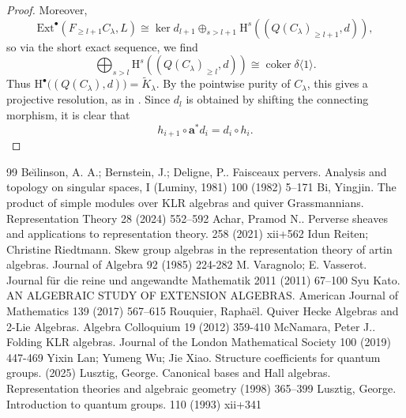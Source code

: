 \documentclass[10pt,a4paper]{amsart}
\begin{document}
\begin{proof}
Moreover,
\[
\mathrm{Ext}^{\bullet}(F_{\geq l+1} C_{\lambda}, L) \cong \ker d_{l+1} \oplus_{s>l+1} \mathrm{H}^s((Q(C_{\lambda})_{\geq l+1}, d)),
\]
so via the short exact sequence, we find
\[
\bigoplus_{s>l} \mathrm{H}^s((Q(C_{\lambda})_{\geq l}, d)) \cong \operatorname{coker} \delta \langle 1 \rangle.
\]
Thus $\mathrm{H}^{\bullet}\bigl((Q(C_{\lambda}), d)\bigr) = \widetilde{K}_{\lambda}$. By the pointwise purity of $C_{\lambda}$, this gives a projective resolution, as in \cite[Proposition 2.8]{cd088214-009e-3813-9a86-97f9a299a24c}.
Since $d_l$ is obtained by shifting the connecting morphism, it is clear that
\[
h_{i+1} \circ \mathbf{a}^* d_i = d_i \circ h_i.
\]
\end{proof}


\begin{thebibliography}{99}
 Be\u{\i}linson, A. A.; Bernstein, J.; Deligne, P.. Faisceaux pervers. Analysis and topology on singular spaces, {I} ({L}uminy, 1981) 100 (1982) 5--171
 Bi, Yingjin. The product of simple modules over {KLR} algebras and quiver {G}rassmannians. Representation Theory 28 (2024) 552--592
 Achar, Pramod N.. Perverse sheaves and applications to representation theory. 258 (2021) xii+562
 Idun Reiten; Christine Riedtmann. Skew group algebras in the representation theory of artin algebras. Journal of Algebra 92 (1985) 224-282
 M. Varagnolo; E. Vasserot. Journal für die reine und angewandte Mathematik 2011 (2011) 67--100
 Syu Kato. AN ALGEBRAIC STUDY OF EXTENSION ALGEBRAS. American Journal of Mathematics 139 (2017) 567--615
 Rouquier, Rapha\"{e}l. Quiver {Hecke} Algebras and 2-{Lie} Algebras. Algebra Colloquium 19 (2012) 359-410
 McNamara, Peter J.. Folding {KLR} algebras. Journal of the London Mathematical Society 100 (2019) 447-469
 Yixin Lan; Yumeng Wu; Jie Xiao. Structure coefficients for quantum groups. (2025)
 Lusztig, George. Canonical bases and {H}all algebras. Representation theories and algebraic geometry (1998) 365--399
 Lusztig, George. Introduction to quantum groups. 110 (1993) xii+341
\end{thebibliography}
\end{document}
